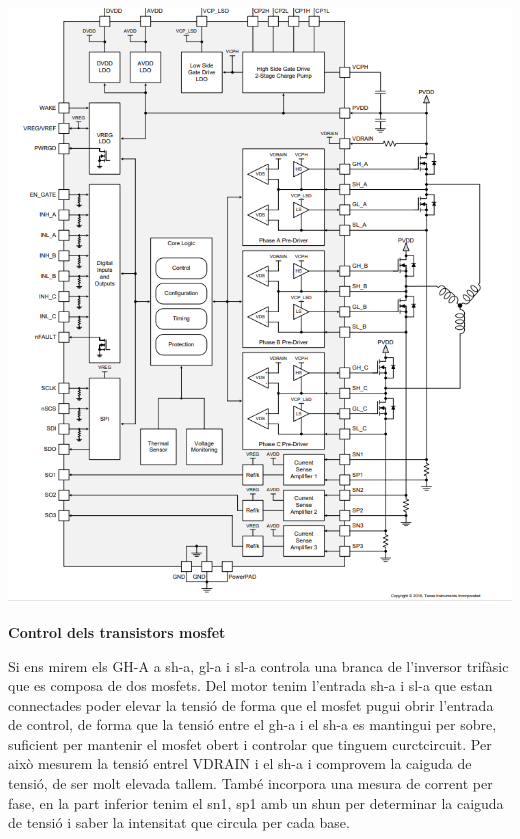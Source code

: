 \includegraphics[width=\textwidth]{Motors/controlsquematic}

\textbf{Control dels transistors mosfet}\newline \smallskip

Si ens mirem els GH-A a sh-a, gl-a i sl-a controla una branca de l'inversor trifàsic que es composa de dos mosfets. Del motor tenim l'entrada sh-a i sl-a que estan connectades poder elevar la tensió de forma que el mosfet pugui obrir l'entrada de control, de forma que la tensió entre el gh-a i el sh-a es mantingui per sobre, suficient per mantenir el mosfet obert i controlar que tinguem curctcircuit. Per això mesurem la tensió entrel VDRAIN i el sh-a i comprovem la caiguda de tensió, de ser molt elevada tallem. També incorpora una mesura de corrent per fase, en la part inferior tenim el sn1, sp1 amb un shun per determinar la caiguda de tensió i saber la intensitat que circula per cada base.

